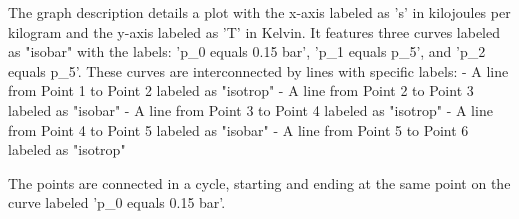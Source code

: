 The graph description details a plot with the x-axis labeled as 's' in kilojoules per kilogram and the y-axis labeled as 'T' in Kelvin. It features three curves labeled as "isobar" with the labels: 'p_0 equals 0.15 bar', 'p_1 equals p_5', and 'p_2 equals p_5'. These curves are interconnected by lines with specific labels:
- A line from Point 1 to Point 2 labeled as "isotrop"
- A line from Point 2 to Point 3 labeled as "isobar"
- A line from Point 3 to Point 4 labeled as "isotrop"
- A line from Point 4 to Point 5 labeled as "isobar"
- A line from Point 5 to Point 6 labeled as "isotrop"

The points are connected in a cycle, starting and ending at the same point on the curve labeled 'p_0 equals 0.15 bar'.